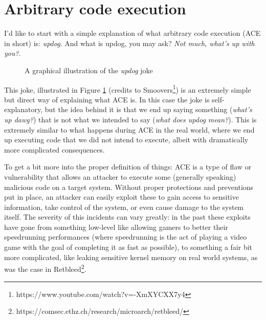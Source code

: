 \documentclass[a4paper]{usiinfbachelorproject}
\begin{document}
\section{\textbf{Arbitrary code execution}}
\label{sec:ace}
I'd like to start with a simple explanation of what arbitrary code execution (ACE in short) is: \textit{updog}. And what is updog, you may ask? \textit{Not much, what's up with you?}.

\begin{figure}[h!]
	\caption{A graphical illustration of the \textit{updog} joke\label{fig:updog}}
\end{figure}

This joke, illustrated in Figure \ref{fig:updog} (credits to Smoovers\footnote{https://www.youtube.com/watch?v=-XmXYCXX7y4}) is an extremely simple but direct way of explaining what ACE is. In this case the joke is self-explanatory, but the idea behind it is that we end up saying something (\textit{what's up dawg?}) that is not what we intended to say (\textit{what does updog mean?}). This is extremely similar to what happens during ACE in the real world, where we end up executing code that we did not intend to execute, albeit with dramatically more complicated consequences.

To get a bit more into the proper definition of things: ACE is a type of flaw or vulnerability that allows an attacker to execute some (generally speaking) malicious code on a target system. Without proper protections and preventions put in place, an attacker can easily exploit these to gain access to sensitive information, take control of the system, or even cause damage to the system itself. The severity of this incidents can vary greatly: in the past these exploits have gone from something low-level like allowing gamers to better their speedrunning performances (where speedrunning is the act of playing a video game with the goal of completing it as fast as possible), to something a fair bit more complicated, like leaking sensitive kernel memory on real world systems, as was the case in Retbleed\footnote{https://comsec.ethz.ch/research/microarch/retbleed/}.
\end{document}
